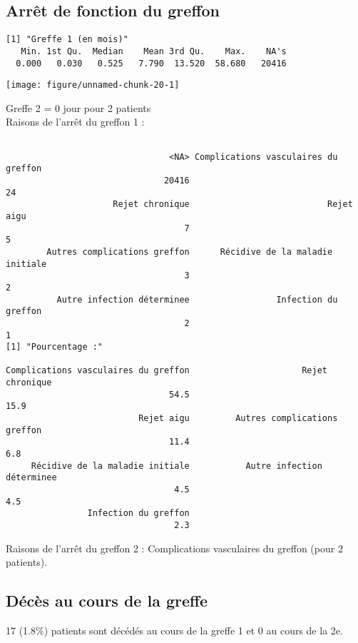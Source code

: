 \documentclass[11pt,a4paper]{article}\usepackage[]{graphicx}\usepackage[]{color}
\makeatletter
\def\maxwidth{ %
  \ifdim\Gin@nat@width>\linewidth
    \linewidth
  \else
    \Gin@nat@width
  \fi
}
\newenvironment{kframe}{%
 \def\at@end@of@kframe{}%
 \ifinner\ifhmode%
  \def\at@end@of@kframe{\end{minipage}}%
  \begin{minipage}{\columnwidth}%
 \fi\fi%
 \def\FrameCommand##1{\hskip\@totalleftmargin \hskip-\fboxsep
 \colorbox{shadecolor}{##1}\hskip-\fboxsep
     \hskip-\linewidth \hskip-\@totalleftmargin \hskip\columnwidth}%
 \MakeFramed {\advance\hsize-\width
   \@totalleftmargin\z@ \linewidth\hsize
   \@setminipage}}%
 {\par\unskip\endMakeFramed%
 \at@end@of@kframe}
\newenvironment{knitrout}{}{} %
\makeatother
\begin{document}
  \subsection{Arrêt de fonction du greffon}
  
\begin{knitrout}
\color{fgcolor}\begin{kframe}
\begin{verbatim}
[1] "Greffe 1 (en mois)"
   Min. 1st Qu.  Median    Mean 3rd Qu.    Max.    NA's 
  0.000   0.030   0.525   7.790  13.520  58.680   20416 
\end{verbatim}
\end{kframe}
\texttt{[image: figure/unnamed-chunk-20-1]} 

\end{knitrout}
Greffe 2 = 0 jour pour 2 patients
~\\

Raisons de l'arrêt du greffon 1 :
\begin{knitrout}
\color{fgcolor}\begin{kframe}
\begin{verbatim}

                                <NA> Complications vasculaires du greffon 
                               20416                                   24 
                     Rejet chronique                           Rejet aigu 
                                   7                                    5 
        Autres complications greffon      Récidive de la maladie initiale 
                                   3                                    2 
          Autre infection déterminee                 Infection du greffon 
                                   2                                    1 
[1] "Pourcentage :"

Complications vasculaires du greffon                      Rejet chronique 
                                54.5                                 15.9 
                          Rejet aigu         Autres complications greffon 
                                11.4                                  6.8 
     Récidive de la maladie initiale           Autre infection déterminee 
                                 4.5                                  4.5 
                Infection du greffon 
                                 2.3 
\end{verbatim}
\end{kframe}
\end{knitrout}

Raisons de l'arrêt du greffon 2 : Complications vasculaires du greffon  (pour 2 patients).

  \subsection{Décès au cours de la greffe}

17 (1.8\%) patients sont décédés au cours de la greffe 1 et 0 au cours de la 2e.
\end{document}
